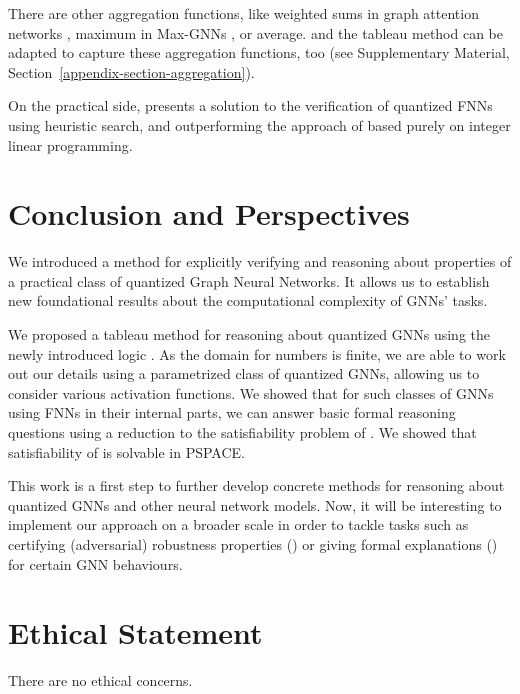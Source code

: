 There are other aggregation functions, like weighted sums in graph attention networks \cite{DBLP:conf/iclr/VelickovicCCRLB18}, maximum in Max-GNNs \cite{DBLP:conf/kr/CucalaG24}, or average. \thelogic{} and the tableau method can be adapted to capture these aggregation functions, too (see Supplementary Material, Section~\ref{appendix-section-aggregation}). 

On the practical side, \citet{DBLP:conf/aaai/000200DWZB24} presents a solution to the verification of quantized FNNs using heuristic search, and outperforming the approach of \citet{10.1145/3551349.3556916} based purely on integer linear programming.

\section{Conclusion and Perspectives}
\label{sec:outlook}

We introduced a method for explicitly verifying and reasoning about properties of a practical class of quantized Graph Neural Networks. 
It allows us to establish new foundational results about the computational complexity of GNNs' tasks.

We proposed a tableau method for reasoning about quantized GNNs using the newly introduced logic \thelogic{}. As the domain for numbers is finite, we are able to work out our details using a parametrized class of quantized GNNs, allowing us to consider various activation functions.
We showed that for such classes of GNNs using FNNs in their internal parts, we can answer basic formal reasoning questions using a reduction to the satisfiability problem of \thelogic{}.
We showed that satisfiability of  \thelogic{}
is solvable in PSPACE. 


This work is a first step to further develop concrete methods for reasoning about quantized GNNs and other neural network models. Now, it will be interesting to implement our approach on  a broader scale in order to tackle tasks such as certifying (adversarial) robustness properties (\cite{Gunnemann2022}) or giving formal explanations (\cite{0001I22_formalxai}) for certain GNN behaviours.

\section*{Ethical Statement}
There are no ethical concerns.